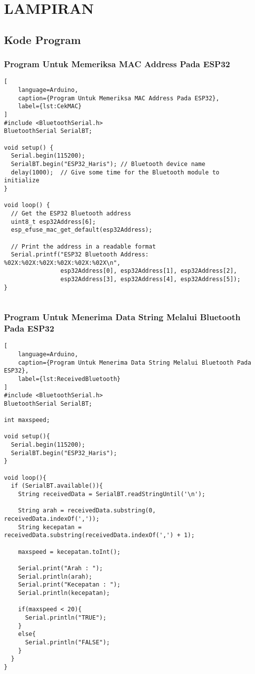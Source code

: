 \chapter*{LAMPIRAN}

\section{Kode Program}
\subsection{Program Untuk Memeriksa MAC Address Pada ESP32}
\begin{lstlisting}[
    language=Arduino,
    caption={Program Untuk Memeriksa MAC Address Pada ESP32},
    label={lst:CekMAC}
]
#include <BluetoothSerial.h>
BluetoothSerial SerialBT;

void setup() {
  Serial.begin(115200);
  SerialBT.begin("ESP32_Haris"); // Bluetooth device name
  delay(1000);  // Give some time for the Bluetooth module to initialize
}

void loop() {
  // Get the ESP32 Bluetooth address
  uint8_t esp32Address[6];
  esp_efuse_mac_get_default(esp32Address);

  // Print the address in a readable format
  Serial.printf("ESP32 Bluetooth Address: %02X:%02X:%02X:%02X:%02X:%02X\n",
                esp32Address[0], esp32Address[1], esp32Address[2],
                esp32Address[3], esp32Address[4], esp32Address[5]);
}
    
\end{lstlisting}

\subsection{Program Untuk Menerima Data String Melalui Bluetooth Pada ESP32}

\begin{lstlisting}[
    language=Arduino,
    caption={Program Untuk Menerima Data String Melalui Bluetooth Pada ESP32},
    label={lst:ReceivedBluetooth}
]
#include <BluetoothSerial.h>
BluetoothSerial SerialBT;

int maxspeed;

void setup(){
  Serial.begin(115200);
  SerialBT.begin("ESP32_Haris");
}

void loop(){
  if (SerialBT.available()){
    String receivedData = SerialBT.readStringUntil('\n');

    String arah = receivedData.substring(0, receivedData.indexOf(','));
    String kecepatan = receivedData.substring(receivedData.indexOf(',') + 1);

    maxspeed = kecepatan.toInt();

    Serial.print("Arah : ");
    Serial.println(arah);
    Serial.print("Kecepatan : ");
    Serial.println(kecepatan);

    if(maxspeed < 20){
      Serial.println("TRUE");
    }
    else{
      Serial.println("FALSE");
    }
  }
}
    
\end{lstlisting}

